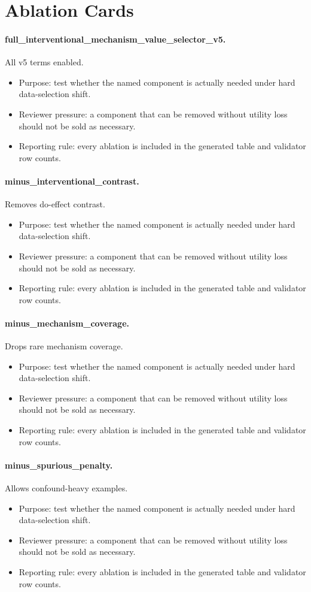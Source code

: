 \documentclass{article}
\begin{document}
\section{Ablation Cards}
\paragraph{full\_interventional\_mechanism\_value\_selector\_v5.} All v5 terms enabled.
\begin{itemize}
\item Purpose: test whether the named component is actually needed under hard data-selection shift.
\item Reviewer pressure: a component that can be removed without utility loss should not be sold as necessary.
\item Reporting rule: every ablation is included in the generated table and validator row counts.
\end{itemize}
\paragraph{minus\_interventional\_contrast.} Removes do-effect contrast.
\begin{itemize}
\item Purpose: test whether the named component is actually needed under hard data-selection shift.
\item Reviewer pressure: a component that can be removed without utility loss should not be sold as necessary.
\item Reporting rule: every ablation is included in the generated table and validator row counts.
\end{itemize}
\paragraph{minus\_mechanism\_coverage.} Drops rare mechanism coverage.
\begin{itemize}
\item Purpose: test whether the named component is actually needed under hard data-selection shift.
\item Reviewer pressure: a component that can be removed without utility loss should not be sold as necessary.
\item Reporting rule: every ablation is included in the generated table and validator row counts.
\end{itemize}
\paragraph{minus\_spurious\_penalty.} Allows confound-heavy examples.
\begin{itemize}
\item Purpose: test whether the named component is actually needed under hard data-selection shift.
\item Reviewer pressure: a component that can be removed without utility loss should not be sold as necessary.
\item Reporting rule: every ablation is included in the generated table and validator row counts.
\end{itemize}
\end{document}
